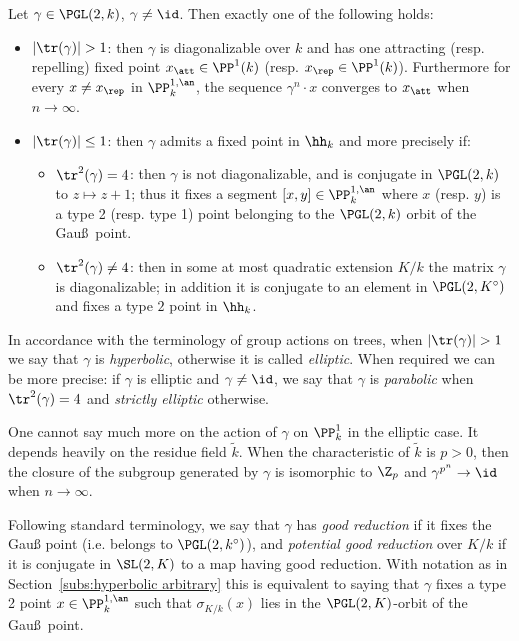 \begin{prop}\label{prop:claselt}
Let $\gamma\in \PGL(2,k)$, $\gamma\neq \id$. Then exactly one of the following holds:
\begin{itemize}
\item $\mathopen{|}\tr(\gamma)| >1$: then $\gamma$ is diagonalizable over $k$ and has one attracting (resp. repelling) fixed point $x_\att \in \PP^1(k)$ (resp. $x_\rep \in \PP^1(k)$). Furthermore for every $x\neq x_\rep$ in $\PP^{1,\an}_k$, the sequence $\gamma^n\cdot x $ converges to $ x_\att$ when $n\to\infty$.
\item $\mathopen{|}\tr(\gamma)| \leq 1$: then $\gamma$ admits a fixed point in $\hh_k$ and more precisely if:
\begin{itemize}
\item $\tr^2(\gamma) =4$: then $\gamma$ is not diagonalizable, and is conjugate in $\PGL(2,k)$ to $z\mapsto z+1$; thus it fixes a segment $[x,y] \in \PP^{1,\an}_k$ where $x$ (resp. $y$) is a type 2 (resp. type 1) point belonging to the $\PGL(2,k)$ orbit of the Gau\ss\ point.
\item $\tr^2(\gamma) \neq 4$: then in some at most quadratic extension $K/k$ the matrix $\gamma$ is diagonalizable; in addition it is conjugate to an element in $\PGL(2,K^\circ)$ and fixes a type $2$ point in $\hh_k$.
\end{itemize}
\end{itemize}
\end{prop}

In accordance with the terminology of group actions on trees, when $\mathopen{|}\tr(\gamma)| >1$ we say that $\gamma$ is \emph{hyperbolic}, otherwise it is called \emph{elliptic}. When required we can be more precise: if $\gamma$ is elliptic and $\gamma\neq \id$, we say that $\gamma$ is \emph{parabolic} when $\tr^2(\gamma) =4$ and \emph{strictly elliptic} otherwise.


One cannot say much more on the action of $\gamma$ on $\PP^1_k$ in the elliptic case. It depends heavily on the residue field $\widetilde{k}$. When the characteristic of $\widetilde{k}$ is $p>0$, then the closure of the subgroup generated by $\gamma$ is isomorphic to $\Z_p$ and $\gamma^{p^n} \to \id$ when $n\to\infty$.


Following standard terminology, we say that $\gamma$ has \emph{good reduction} if it fixes the Gau{\ss} point (i.e. belongs to $\PGL(2,k^\circ)$), and \emph{potential good reduction} over $K/k$ if it is conjugate in $\SL(2,K)$ to a map having good reduction. With notation as in Section~\ref{subs:hyperbolic arbitrary} this is equivalent to saying that $\gamma$ fixes a type 2 point $x\in \PP^{1,\an}_k$ such that $\sigma_{K/k}(x)$ lies in the $\PGL(2,K)$-orbit of the Gau\ss\ point.



